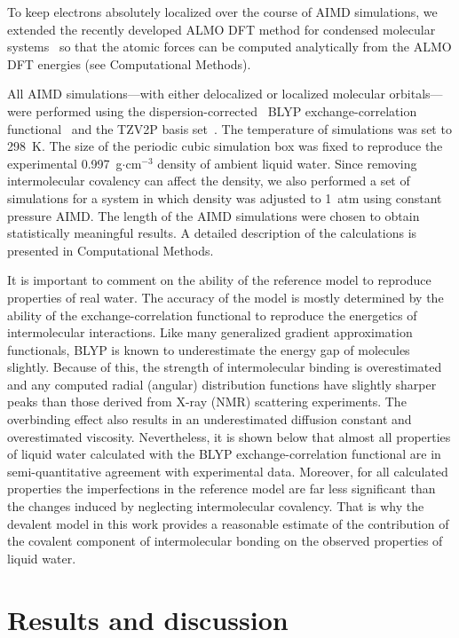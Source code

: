 \documentclass[aps,prl,reprint,amsmath,amssymb]{revtex4-1}
\begin{document}
To keep electrons absolutely localized over the course of AIMD simulations, we extended the recently developed ALMO DFT method for condensed molecular systems~\cite{Khaliullin2013JCTC} so that the atomic forces can be computed analytically from the ALMO DFT energies (see Computational Methods).

All AIMD simulations---with either delocalized or localized molecular orbitals---were performed using the dispersion-corrected~\cite{grimme2010consistent} BLYP exchange-correlation functional~\cite{becke1988density, lee1988development} and the TZV2P basis set~\cite{vandevondele2007gaussian}. 
The temperature of simulations was set to 298~K. 
The size of the periodic cubic simulation box was fixed to reproduce the experimental 0.997~g$\cdot$cm$^{-3}$ density of ambient liquid water. 
Since removing intermolecular covalency can affect the density, we also performed a set of simulations for a system in which density was adjusted to 1~atm using constant pressure AIMD. 
The length of the AIMD simulations were chosen to obtain statistically meaningful results. 
A detailed description of the calculations is presented in Computational Methods.

It is important to comment on the ability of the reference model to reproduce properties of real water. 
The accuracy of the model is mostly determined by the ability of the exchange-correlation functional to reproduce the energetics of intermolecular interactions. Like many generalized gradient approximation functionals, BLYP is known to underestimate the energy gap of molecules slightly. 
Because of this, the strength of intermolecular binding is overestimated and any computed radial (angular) distribution functions have slightly sharper peaks than those derived from X-ray (NMR) scattering experiments. 
The overbinding effect also results in an underestimated diffusion constant and overestimated viscosity. 
Nevertheless, it is shown below that almost all properties of liquid water calculated with the BLYP exchange-correlation functional are in semi-quantitative agreement with experimental data. 
Moreover, for all calculated properties the imperfections in the reference model are far less significant than the changes induced by neglecting intermolecular covalency. 
That is why the devalent model in this work provides a reasonable estimate of the contribution of the covalent component of intermolecular bonding on the observed properties of liquid water.


\section{Results and discussion}
\end{document}

